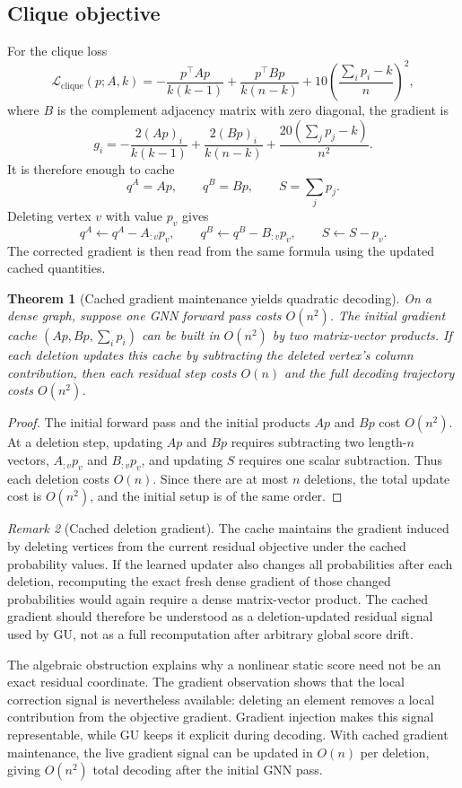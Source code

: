 \documentclass[11pt]{article}
\theoremstyle{plain}
\newtheorem{theorem}{Theorem}[section]
\theoremstyle{remark}
\newtheorem{remark}[theorem]{Remark}
\begin{document}
\subsection*{Clique objective}

For the clique loss
\[
  \mathcal{L}_{\mathrm{clique}}(p;A,k)
  =
  -\frac{p^\top A p}{k(k-1)}
  +
  \frac{p^\top B p}{k(n-k)}
  +
  10\left(\frac{\sum_i p_i-k}{n}\right)^2,
\]
where $B$ is the complement adjacency matrix with zero diagonal, the gradient is
\[
  g_i
  =
  -\frac{2(Ap)_i}{k(k-1)}
  +
  \frac{2(Bp)_i}{k(n-k)}
  +
  \frac{20(\sum_j p_j-k)}{n^2}.
\]
It is therefore enough to cache
\[
  q^A=Ap,
  \qquad
  q^B=Bp,
  \qquad
  S=\sum_j p_j.
\]
Deleting vertex $v$ with value $p_v$ gives
\[
  q^A \leftarrow q^A-A_{:v}p_v,
  \qquad
  q^B \leftarrow q^B-B_{:v}p_v,
  \qquad
  S \leftarrow S-p_v.
\]
The corrected gradient is then read from the same formula using the updated
cached quantities.

\begin{theorem}[Cached gradient maintenance yields quadratic decoding]
  \label{thm:cached_gradient_complexity}
  On a dense graph, suppose one GNN forward pass costs $O(n^2)$. The initial
  gradient cache $(Ap,Bp,\sum_i p_i)$ can be built in $O(n^2)$ by two
  matrix-vector products. If each deletion updates this cache by subtracting the
  deleted vertex's column contribution, then each residual step costs $O(n)$ and
  the full decoding trajectory costs $O(n^2)$.
\end{theorem}

\begin{proof}
  The initial forward pass and the initial products $Ap$ and $Bp$ cost
  $O(n^2)$.  At a deletion step, updating $Ap$ and $Bp$ requires subtracting two
  length-$n$ vectors, $A_{:v}p_v$ and $B_{:v}p_v$, and updating $S$ requires one
  scalar subtraction.  Thus each deletion costs $O(n)$.  Since there are at most
  $n$ deletions, the total update cost is $O(n^2)$, and the initial setup is of
  the same order.
\end{proof}

\begin{remark}[Cached deletion gradient]
  The cache maintains the gradient induced by deleting vertices from the current
  residual objective under the cached probability values.  If the learned updater
  also changes all probabilities after each deletion, recomputing the exact
  fresh dense gradient of those changed probabilities would again require a
  dense matrix-vector product.  The cached gradient should therefore be understood
  as a deletion-updated residual signal used by GU, not as a full recomputation
  after arbitrary global score drift.
\end{remark}


The algebraic obstruction explains why a nonlinear static score need not be an
exact residual coordinate.  The gradient observation shows that the local
correction signal is nevertheless available: deleting an element removes a local
contribution from the objective gradient.  Gradient injection makes this signal
representable, while GU keeps it explicit during decoding.  With cached gradient
maintenance, the live gradient signal can be updated in $O(n)$ per deletion,
giving $O(n^2)$ total decoding after the initial GNN pass.
\end{document}

